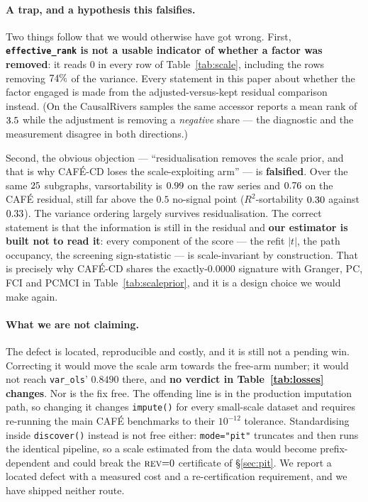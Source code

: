 \documentclass[10pt,twocolumn]{article}
\newcommand{\cafe}{CAF\'E}
\DeclareRobustCommand{\cd}{\cafe{}\nobreakdash-CD}
\begin{document}
\paragraph{A trap, and a hypothesis this falsifies.} Two things follow that we would
otherwise have got wrong. First, \textbf{\texttt{effective\_rank} is not a usable
indicator of whether a factor was removed}: it reads $0$ in every row of
Table~\ref{tab:scale}, including the rows removing $74\%$ of the variance. Every
statement in this paper about whether the factor engaged is made from the
adjusted-versus-kept residual comparison instead. (On the CausalRivers samples the same
accessor reports a mean rank of $3.5$ while the adjustment is removing a
\emph{negative} share --- the diagnostic and the measurement disagree in both
directions.)

Second, the obvious objection --- ``residualisation removes the scale prior, and that is
why \cd{} loses the scale-exploiting arm'' --- is \textbf{falsified}. Over the same
$25$ subgraphs, varsortability is $0.99$ on the raw series and $0.76$ on the
\cafe{} residual, still far above the $0.5$ no-signal point ($R^2$-sortability $0.30$
against $0.33$). The variance ordering largely survives residualisation. The correct
statement is that the information is still in the residual and \textbf{our estimator is
built not to read it}: every component of the score --- the refit $|t|$, the path
occupancy, the screening sign-statistic --- is scale-invariant by construction. That is
precisely why \cd{} shares the exactly-$0.0000$ signature with Granger, PC, FCI and
PCMCI in Table~\ref{tab:scaleprior}, and it is a design choice we would make again.

\paragraph{What we are not claiming.} The defect is located, reproducible and costly,
and it is still not a pending win. Correcting it would move the scale arm towards the
free-arm number; it would not reach \texttt{var\_ols}' $0.8490$ there, and \textbf{no
verdict in Table~\ref{tab:losses} changes}. Nor is the fix free. The offending line is in
the production imputation path, so changing it changes \texttt{impute()} for every
small-scale dataset and requires re-running the main \cafe{} benchmarks to their
$10^{-12}$ tolerance. Standardising inside \texttt{discover()} instead is not free
either: \texttt{mode="pit"} truncates and then runs the identical pipeline, so a scale
estimated from the data would become prefix-dependent and could break the
$\textsc{rev}{=}0$ certificate of \S\ref{sec:pit}. We report a located defect with a
measured cost and a re-certification requirement, and we have shipped neither route.
\end{document}

